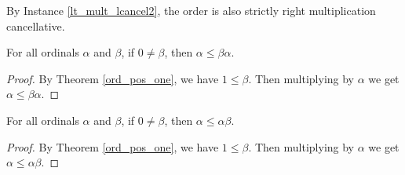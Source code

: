 \documentclass[../../math.tex]{subfiles}
\begin{document}
By Instance \ref{lt_mult_lcancel2}, the order is also strictly right
multiplication cancellative.

\begin{theorem} \label{ord_le_self_lmult}
    For all ordinals $\alpha$ and $\beta$, if $0 \neq \beta$, then $\alpha \leq
    \beta \alpha$.
\end{theorem}
\begin{proof}
    By Theorem \ref{ord_pos_one}, we have $1 \leq \beta$.  Then multiplying by
    $\alpha$ we get $\alpha \leq \beta \alpha$.
\end{proof}

\begin{theorem} \label{ord_le_self_rmult}
    For all ordinals $\alpha$ and $\beta$, if $0 \neq \beta$, then $\alpha \leq
    \alpha \beta$.
\end{theorem}
\begin{proof}
    By Theorem \ref{ord_pos_one}, we have $1 \leq \beta$.  Then multiplying by
    $\alpha$ we get $\alpha \leq \alpha \beta$.
\end{proof}
\end{document}
